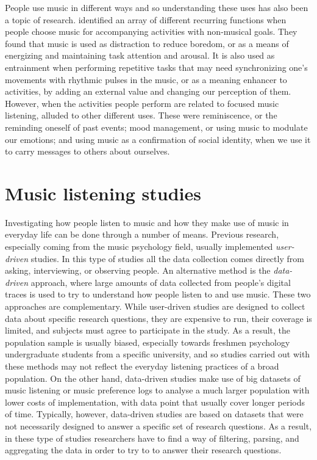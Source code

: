 People use music in different ways and so understanding these uses has also been a topic of research. \textcite{sloboda09choosing} identified an array of different recurring functions when people choose music for accompanying activities with non-musical goals. They found that music is used as distraction to reduce boredom, or as a means of energizing and maintaining task attention and arousal. It is also used as entrainment when performing repetitive tasks that may need synchronizing one's movements with rhythmic pulses in the music, or as a meaning enhancer to activities, by adding an external value and changing our perception of them.
However, when the activities people perform are related to focused music listening, \citeauthor{sloboda09choosing} alluded to other different uses. These were reminiscence, or the reminding oneself of past events; mood management, or using music to modulate our emotions; and using music as a confirmation of social identity, when we use it to carry messages to others about ourselves.


\section{Music listening studies}\label{section:music-listening-studies}
Investigating how people listen to music and how they make use of music in everyday life can be done through a number of means.
Previous research, especially coming from the music psychology field, usually implemented \emph{user-driven} studies. In this type of studies all the data collection comes directly from asking, interviewing, or observing people. 
An alternative method is the \emph{data-driven} approach, where large amounts of data collected from people's digital traces is used to try to understand how people listen to and use music. These two approaches are complementary. While user-driven studies are designed to collect data about specific research questions, they are expensive to run, their coverage is limited, and subjects must agree to participate in the study. As a result, the population sample is usually biased, especially towards freshmen psychology undergraduate students from a specific university, and so studies carried out with these methods may not reflect the everyday listening practices of a broad population. 
On the other hand, data-driven studies make use of big datasets of music listening or music preference logs to analyse a much larger population with lower costs of implementation, with data point that usually cover longer periods of time. 
Typically, however, data-driven studies are based on datasets that were not necessarily designed to answer a specific set of research questions. As a result, in these type of studies researchers have to find a way of filtering, parsing, and aggregating the data in order to try to to answer their research questions.

